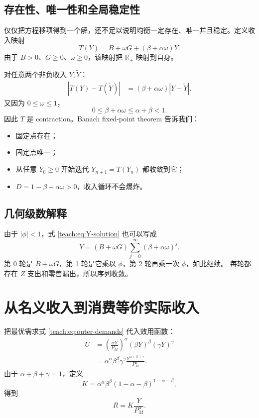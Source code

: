 \documentclass[UTF8,11pt,scheme=chinese,fontset=fandol]{ctexart}
\newcommand{\Rplus}{\mathbb R_{+}}
\theoremstyle{definition}
\begin{document}
\subsection{存在性、唯一性和全局稳定性}

仅仅把方程移项得到一个解，还不足以说明均衡一定存在、唯一并且稳定。定义收入映射
\begin{equation}
T(Y)=B+\omega G+(\beta+\alpha\omega)Y.
\end{equation}
由于 \(B>0\)、\(G\ge0\)、\(\omega\ge0\)，该映射把 \(\Rplus\) 映射到自身。

对任意两个非负收入 \(Y,\widetilde Y\)：
\begin{align}
|T(Y)-T(\widetilde Y)|
&=(\beta+\alpha\omega)|Y-\widetilde Y|.
\end{align}
又因为 \(0\le\omega\le1\)，
\begin{equation}
0\le\beta+\alpha\omega
\le\alpha+\beta<1.
\end{equation}
因此 \(T\) 是 contraction。Banach fixed-point theorem 告诉我们：

\begin{itemize}
  \item 固定点存在；
  \item 固定点唯一；
  \item 从任意 \(Y_0\ge0\) 开始迭代 \(Y_{n+1}=T(Y_n)\) 都收敛到它；
  \item \(D=1-\beta-\alpha\omega>0\)，收入循环不会爆炸。
\end{itemize}

\subsection{几何级数解释}

由于 \(|\phi|<1\)，式 \eqref{teach:eq:Y-solution} 也可以写成
\begin{equation}
Y=(B+\omega G)\sum_{j=0}^{\infty}(\beta+\alpha\omega)^j.
\label{teach:eq:Y-series}
\end{equation}
第 0 轮是 \(B+\omega G\)，第 1 轮是它乘以 \(\phi\)，第 2 轮再乘一次 \(\phi\)，如此继续。
每轮都存在 \(Z\) 支出和零售漏出，所以序列收敛。

\section{从名义收入到消费等价实际收入}

把最优需求式 \eqref{teach:eq:outer-demands} 代入效用函数：
\begin{align}
U
&=\left(\frac{\alpha Y}{P_M}\right)^\alpha
(\beta Y)^\beta(\gamma Y)^\gamma\\
&=\alpha^\alpha\beta^\beta\gamma^\gamma
\frac{Y^{\alpha+\beta+\gamma}}{P_M^\alpha}.
\end{align}
由于 \(\alpha+\beta+\gamma=1\)，定义
\begin{equation}
K=\alpha^\alpha\beta^\beta(1-\alpha-\beta)^{1-\alpha-\beta},
\end{equation}
得到
\begin{equation}
\boxed{R=K\frac{Y}{P_M^\alpha}.}
\label{teach:eq:R}
\end{equation}
\end{document}

